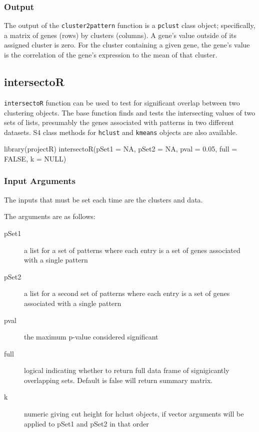 \documentclass[]{article}
\renewenvironment{verbatim}{\color{codecolor}\begin{myshaded}\begin{oldverbatim}}{\end{oldverbatim}\end{myshaded}}
\begin{document}
\hypertarget{output-2}{%
\subsubsection{Output}\label{output-2}}

The output of the \texttt{cluster2pattern} function is a \texttt{pclust} class object; specifically, a matrix of genes (rows) by clusters (columns). A gene's value outside of its assigned cluster is zero. For the cluster containing a given gene, the gene's value is the correlation of the gene's expression to the mean of that cluster.

\hypertarget{intersector}{%
\subsection{intersectoR}\label{intersector}}

\texttt{intersectoR} function can be used to test for significant overlap between two clustering objects. The base function finds and tests the intersecting values of two sets of lists, presumably the genes associated with patterns in two different datasets. S4 class methods for \texttt{hclust} and \texttt{kmeans} objects are also available.

\begin{verbatim}
library(projectR)
intersectoR(pSet1 = NA, pSet2 = NA, pval = 0.05, full = FALSE, k = NULL)
\end{verbatim}

\hypertarget{input-arguments-3}{%
\subsubsection{Input Arguments}\label{input-arguments-3}}

The inputs that must be set each time are the clusters and data.

The arguments are as follows:

\begin{description}
\item[pSet1]{a list for a set of patterns where each entry is a set of genes associated with a single pattern}
\item[pSet2]{a list for a second set of patterns where each entry is a set of genes associated with a single pattern}
\item[pval]{the maximum p-value considered significant}
\item[full]{logical indicating whether to return full data frame of signigicantly overlapping sets. Default is false will return summary matrix.}
\item[k]{numeric giving cut height for hclust objects, if vector arguments will be applied to pSet1 and pSet2 in that order}
\end{description}
\end{document}
